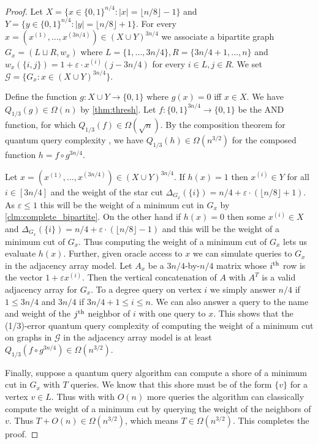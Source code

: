 \documentclass[10pt,a4paper]{article}
\newcommand{\Gcal}{\mathcal{G}}
\newcommand{\floor}[1]{\lfloor #1 \rfloor}
\newcommand{\ith}{i^{\scriptsize \mbox{{\rm th}}}}
\newcommand{\jth}{j^{\scriptsize \mbox{{\rm th}}}}
\newcommand{\1}{\mathbf{1}}
\theoremstyle{definition}
\begin{document}
\begin{proof}
Let $X =\{x \in \{0,1\}^{n/4}: |x| = \floor{n/8}-1\}$ and $Y =\{y \in \{0,1\}^{n/4}: |y| = \floor{n/8}+1\}$.  For every 
$x = (x^{(1)}, \ldots, x^{(3n/4)}) \in (X \cup Y)^{3n/4}$ we associate a bipartite graph $G_x = (L \sqcup R, w_x)$ 
where $L = \{1, \ldots, 3n/4\}, R = \{3n/4+1, \ldots, n\}$ and $w_x(\{i,j\}) = 1+ \varepsilon \cdot x^{(i)}(j-3n/4)$ for every $i \in L, j \in R$.  We set $\Gcal = \{G_x : x \in (X \cup Y)^{3n/4}\}$.

Define the function $g: X \cup Y \rightarrow \{0,1\}$ where $g(x) = 0$ iff $x \in X$.  We have $Q_{1/3}(g) \in \Omega(n)$ by \cref{thm:thresh}.  
Let $f : \{0,1\}^{3n/4} \rightarrow \{0,1\}$ be the AND function, for which $Q_{1/3}(f) \in \Omega(\sqrt{n})$.  By the composition theorem for quantum query complexity \cite{HLS07,Rei11a}, 
we have $Q_{1/3}(h) \in \Omega(n^{3/2})$ for the composed function $h = f \circ g^{3n/4}$.   

Let $x = (x^{(1)}, \ldots, x^{(3n/4)}) \in (X \cup Y)^{3n/4}$.  If $h(x) = 1$ then $x^{(i)} \in Y$ for all $i \in [3n/4]$ and the weight of the star cut $\Delta_{G_x}(\{i\}) = n/4 + \varepsilon \cdot(\floor{n/8}+1)$.  
As $\varepsilon \le 1$ this will be the weight of a minimum cut in $G_x$ by \cref{clm:complete_bipartite}.  On the other hand if $h(x) = 0$ then some $x^{(i)} \in X$ and 
$\Delta_{G_x}(\{i\}) = n/4 + \varepsilon \cdot(\floor{n/8}-1)$ and this will be the weight of a minimum cut of $G_x$.
Thus computing the weight of a minimum cut of $G_x$ lets us evaluate $h(x)$.  Further, given oracle access to $x$ we can 
simulate queries to $G_x$ in the adjacency array model.  Let $A_x$ be a $3n/4$-by-$n/4$ matrix whose $\ith$ row is the vector $1+ \varepsilon x^{(i)}$.  Then the vertical concatenation of $A$ with 
$A^T$ is a valid adjacency array for $G_x$.  To a degree query on vertex $i$ we simply answer $n/4$ if $1 \le 3n/4$ and $3n/4$ if $3n/4+1 \le i \le n$.  We can also answer 
a query to the name and weight of the $\jth$ neighbor of $i$ with one query to $x$.  This shows that the (1/3)-error quantum query complexity of computing the weight of 
a minimum cut on graphs in $\Gcal$ in the adjacency array model is at least $Q_{1/3}(f \circ g^{3n/4}) \in \Omega(n^{3/2})$.  

Finally, suppose a quantum query algorithm can compute a shore of a minimum cut in $G_x$ with $T$ queries.  We know that this shore must be of the form $\{v\}$ for a vertex $v \in L$.  
Thus with with $O(n)$ more queries the algorithm can classically compute the weight of a 
minimum cut by querying the weight of the neighbors of $v$.  Thus $T + O(n) \in \Omega(n^{3/2})$, which means $T \in \Omega(n^{3/2})$.  This completes the proof.
\end{proof}
\end{document}
